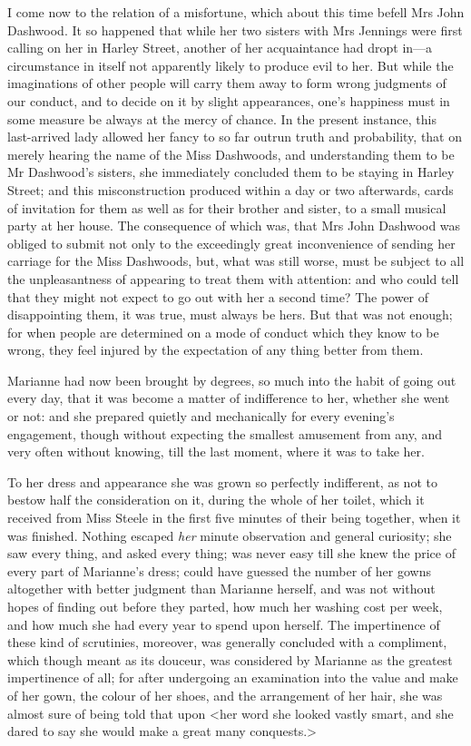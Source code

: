 I come now to the relation of a misfortune, which about this time befell Mrs John Dashwood. It so happened that while her two sisters with Mrs Jennings were first calling on her in Harley Street, another of her acquaintance had dropt in—a circumstance in itself not apparently likely to produce evil to her. But while the imaginations of other people will carry them away to form wrong judgments of our conduct, and to decide on it by slight appearances, one's happiness must in some measure be always at the mercy of chance. In the present instance, this last-arrived lady allowed her fancy to so far outrun truth and probability, that on merely hearing the name of the Miss Dashwoods, and understanding them to be Mr Dashwood's sisters, she immediately concluded them to be staying in Harley Street; and this misconstruction produced within a day or two afterwards, cards of invitation for them as well as for their brother and sister, to a small musical party at her house. The consequence of which was, that Mrs John Dashwood was obliged to submit not only to the exceedingly great inconvenience of sending her carriage for the Miss Dashwoods, but, what was still worse, must be subject to all the unpleasantness of appearing to treat them with attention: and who could tell that they might not expect to go out with her a second time? The power of disappointing them, it was true, must always be hers. But that was not enough; for when people are determined on a mode of conduct which they know to be wrong, they feel injured by the expectation of any thing better from them.

Marianne had now been brought by degrees, so much into the habit of going out every day, that it was become a matter of indifference to her, whether she went or not: and she prepared quietly and mechanically for every evening's engagement, though without expecting the smallest amusement from any, and very often without knowing, till the last moment, where it was to take her.

To her dress and appearance she was grown so perfectly indifferent, as not to bestow half the consideration on it, during the whole of her toilet, which it received from Miss Steele in the first five minutes of their being together, when it was finished. Nothing escaped \textit{her} minute observation and general curiosity; she saw every thing, and asked every thing; was never easy till she knew the price of every part of Marianne's dress; could have guessed the number of her gowns altogether with better judgment than Marianne herself, and was not without hopes of finding out before they parted, how much her washing cost per week, and how much she had every year to spend upon herself. The impertinence of these kind of scrutinies, moreover, was generally concluded with a compliment, which though meant as its douceur, was considered by Marianne as the greatest impertinence of all; for after undergoing an examination into the value and make of her gown, the colour of her shoes, and the arrangement of her hair, she was almost sure of being told that upon <her word she looked vastly smart, and she dared to say she would make a great many conquests.>

